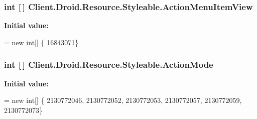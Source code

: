 \subsubsection[{Action\+Menu\+Item\+View}]{\setlength{\rightskip}{0pt plus 5cm}int \mbox{[}$\,$\mbox{]} Client.\+Droid.\+Resource.\+Styleable.\+Action\+Menu\+Item\+View\hspace{0.3cm}{\ttfamily [static]}}\label{classClient_1_1Droid_1_1Resource_1_1Styleable_ae2fb481885aeef4d019164cd289a0e22}
{\bfseries Initial value\+:}
\begin{DoxyCode}
= \textcolor{keyword}{new} \textcolor{keywordtype}{int}[]
            \{
                    16843071\}
\end{DoxyCode}
\hypertarget{classClient_1_1Droid_1_1Resource_1_1Styleable_a940b117980c9ff40debb9c22210ab346}{}
\subsubsection[{Action\+Mode}]{\setlength{\rightskip}{0pt plus 5cm}int \mbox{[}$\,$\mbox{]} Client.\+Droid.\+Resource.\+Styleable.\+Action\+Mode\hspace{0.3cm}{\ttfamily [static]}}\label{classClient_1_1Droid_1_1Resource_1_1Styleable_a940b117980c9ff40debb9c22210ab346}
{\bfseries Initial value\+:}
\begin{DoxyCode}
= \textcolor{keyword}{new} \textcolor{keywordtype}{int}[]
            \{
                    2130772046,
                    2130772052,
                    2130772053,
                    2130772057,
                    2130772059,
                    2130772073\}
\end{DoxyCode}
\hypertarget{classClient_1_1Droid_1_1Resource_1_1Styleable_a76fb7f3f865f999c48cefc7f3e0d010b}{}
